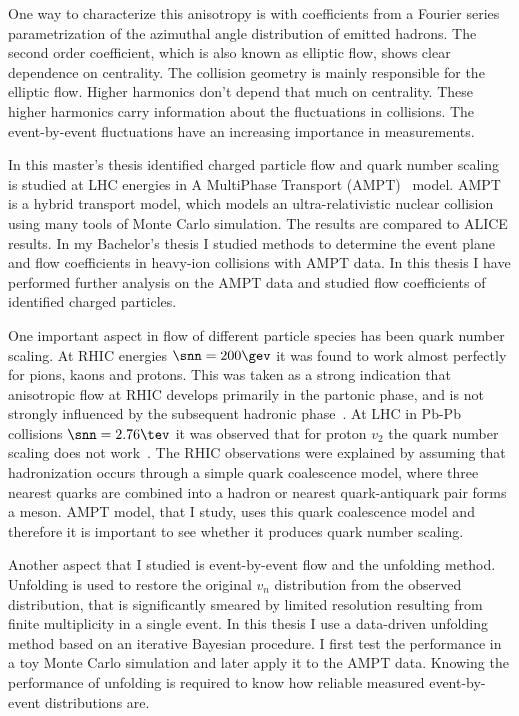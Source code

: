 One way to characterize this anisotropy is with coefficients from a Fourier series parametrization of the azimuthal angle distribution of emitted hadrons. The second order coefficient, which is also known as elliptic flow, shows clear dependence on centrality. The collision geometry is mainly responsible for the elliptic flow. Higher harmonics don't depend that much on centrality. These higher harmonics carry information about the fluctuations in collisions. The event-by-event fluctuations have an increasing importance in measurements. 

In this master's thesis identified charged particle flow and quark number scaling is studied at LHC energies in A MultiPhase Transport (AMPT)~\cite{Lin:2004en, Xu:2011fi} model. AMPT is a hybrid transport model, which models an ultra-relativistic nuclear collision using many tools of Monte Carlo simulation. The results are compared to ALICE results. In my Bachelor's thesis I studied methods to determine the event plane and flow coefficients in heavy-ion collisions with AMPT data. In this thesis I have performed further analysis on the AMPT data and studied flow coefficients of identified charged particles. 

One important aspect in flow of different particle species has been quark number scaling. At RHIC energies  $\snn=200\gev$ it was found to work almost perfectly for pions, kaons and protons. This was taken as a strong indication that anisotropic flow at RHIC develops primarily in the partonic phase, and is not strongly influenced by the subsequent hadronic phase~\cite{Lacey:2012ma}. At LHC in Pb-Pb collisions $\snn=2.76\tev$ it was observed that for proton $v_2$ the quark number scaling does not work~\cite{Lacey:2012ma}. The RHIC observations were explained by assuming that hadronization occurs through a simple quark coalescence model, where three nearest quarks are combined into a hadron or nearest quark-antiquark pair forms a meson. AMPT model, that I study, uses this quark coalescence model and therefore it is important to see whether it produces quark number scaling.  


Another aspect that I studied is event-by-event flow and the unfolding method. Unfolding is used to restore the original $v_n$ distribution from the observed distribution, that is significantly smeared by limited resolution resulting from finite multiplicity in a single event. In this thesis I use a data-driven unfolding method based on an iterative Bayesian procedure. I first test the performance in a toy Monte Carlo simulation and later apply it to the AMPT data. Knowing the performance of unfolding is required to know how reliable measured event-by-event distributions are. 

